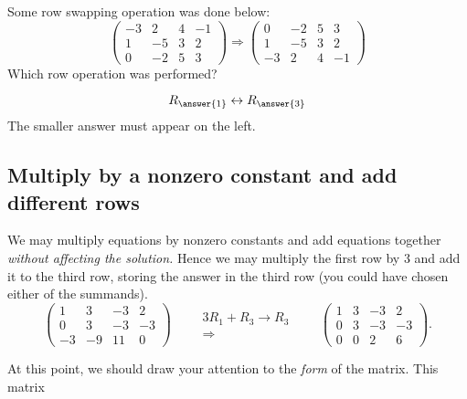 \documentclass{ximera}
\begin{document}
\begin{question}
  Some row swapping operation was done below:
  \[
  \begin{pmatrix}
-3 & 2 & 4 & -1 \\
1 & -5 & 3 & 2 \\
0 & -2 & 5 & 3
  \end{pmatrix}
  \Rightarrow
  \begin{pmatrix}
0 & -2 & 5 & 3 \\
1 & -5 & 3 & 2 \\
-3 & 2 & 4 & -1
\end{pmatrix}
  \]
  Which row operation was performed?
  \begin{prompt}
    \[
    R_{\answer{1}} \leftrightarrow R_{\answer{3}}
    \]
    The smaller answer must appear on the left.
  \end{prompt}
\end{question}

  
\subsection{Multiply by a nonzero constant and add different rows} 
We may multiply equations by nonzero constants and add equations together
\emph{without affecting the solution.} Hence we may multiply the first
row by $3$ and add it to the third row, storing the answer in the
third row (you could have chosen either of the summands).
\[
\left(\begin{array}{ccc|c}
  1 &   3 & -3 & 2  \\
  0 &   3 & -3 & -3 \\
  -3& -9  & 11 & 0
\end{array}\right)
\qquad
\begin{array}{c}
  \scriptstyle 3R_1+R_3\rightarrow R_3\\\Longrightarrow
\end{array}
\qquad
\left(\begin{array}{ccc|c}
  1 &   3 & -3 & 2  \\
  0 &   3 & -3 & -3 \\
  0& 0  & 2 & 6
\end{array}\right).
\]

\begin{question}
\end{question}



At this point, we should draw your attention to the \emph{form} of the matrix. This matrix
\end{document}
